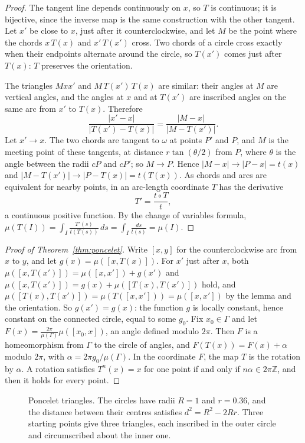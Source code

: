 \begin{proof}
The tangent line depends continuously on $x$, so $T$ is continuous; it is bijective, since the inverse map is the same construction with the other
tangent. Let $x'$ be close to $x$, just after it counterclockwise, and let $M$ be the point where the chords $x\,T(x)$ and $x'\,T(x')$ cross. Two chords of
a circle cross exactly when their endpoints alternate around the circle, so $T(x')$ comes just after $T(x)$: $T$ preserves the orientation.

The triangles $Mxx'$ and $M\,T(x')\,T(x)$ are similar: their angles at $M$ are vertical angles, and the angles at $x$ and at $T(x')$ are inscribed
angles on the same arc from $x'$ to $T(x)$. Therefore
\[
\frac{|x'-x|}{|T(x')-T(x)|}=\frac{|M-x|}{|M-T(x')|}.
\]
Let $x'\to x$. The two chords are tangent to $\omega$ at points $P'$ and $P$, and $M$ is the meeting point of these tangents, at distance
$r\tan(\theta/2)$ from $P$, where $\theta$ is the angle between the radii $cP$ and $cP'$; so $M\to P$. Hence $|M-x|\to|P-x|=t(x)$ and
$|M-T(x')|\to|P-T(x)|=t(T(x))$. As chords and arcs are equivalent for nearby points, in an arc-length coordinate $T$ has the derivative
\[
T'=\frac{t\circ T}{t},
\]
a continuous positive function. By the change of variables formula,
$\mu(T(I))=\int_I\frac{T'(s)}{t(T(s))}\,ds=\int_I\frac{ds}{t(s)}=\mu(I)$.
\end{proof}

\begin{proof}[Proof of Theorem~\ref{thm:poncelet}]
Write $[x,y]$ for the counterclockwise arc from $x$ to $y$, and let $g(x)=\mu([x,T(x)])$. For $x'$ just after $x$, both $\mu([x,T(x')])=\mu([x,x'])+g(x')$
and $\mu([x,T(x')])=g(x)+\mu([T(x),T(x')])$ hold, and $\mu([T(x),T(x')])=\mu(T([x,x']))=\mu([x,x'])$ by the lemma and the orientation. So $g(x')=g(x)$:
the function $g$ is locally constant, hence constant on the connected circle, equal to some $g_0$. Fix $x_0\in\Gamma$ and let
$F(x)=\frac{2\pi}{\mu(\Gamma)}\mu([x_0,x])$, an angle defined modulo $2\pi$. Then $F$ is a homeomorphism from $\Gamma$ to the circle of angles, and
$F(T(x))=F(x)+\alpha$ modulo $2\pi$, with $\alpha=2\pi g_0/\mu(\Gamma)$. In the coordinate $F$, the map $T$ is the rotation by $\alpha$. A rotation
satisfies $T^n(x)=x$ for one point if and only if $n\alpha\in2\pi\mathbb Z$, and then it holds for every point.
\end{proof}

\begin{figure}[ht]
\centering
{}
\caption{Poncelet triangles. The circles have radii $R=1$ and $r=0.36$, and the distance between their centres satisfies $d^2=R^2-2Rr$. Three
starting points give three triangles, each inscribed in the outer circle and circumscribed about the inner one.}
\label{fig:poncelet}
\end{figure}

